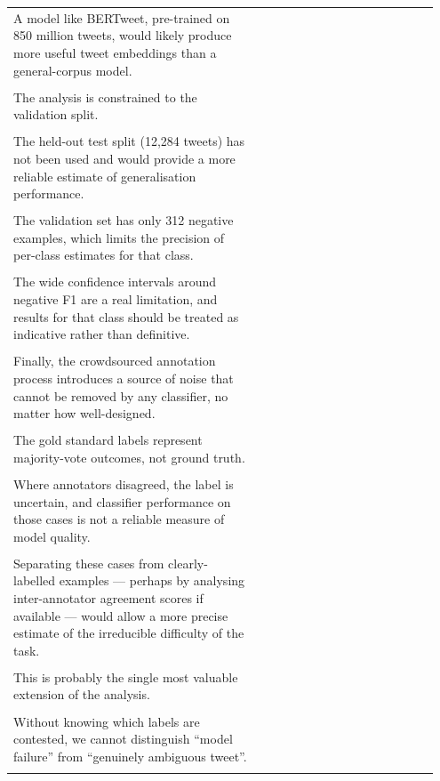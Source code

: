 \documentclass[11pt]{article}
\begin{document}
\begin{longtable}{|p{0.55\linewidth}|p{0.40\linewidth}|}
\hline
\rule{0pt}{3.5cm} & \\
\hline
A model like BERTweet, pre-trained on 850 million tweets, would likely produce more useful tweet embeddings than a general-corpus model. & \\[2pt]
\hline
\rule{0pt}{3.5cm} & \\
\hline
The analysis is constrained to the validation split. & \\[2pt]
\hline
\rule{0pt}{3.5cm} & \\
\hline
The held-out test split (12,284 tweets) has not been used and would provide a more reliable estimate of generalisation performance. & \\[2pt]
\hline
\rule{0pt}{3.5cm} & \\
\hline
The validation set has only 312 negative examples, which limits the precision of per-class estimates for that class. & \\[2pt]
\hline
\rule{0pt}{3.5cm} & \\
\hline
The wide confidence intervals around negative F1 are a real limitation, and results for that class should be treated as indicative rather than definitive. & \\[2pt]
\hline
\rule{0pt}{3.5cm} & \\
\hline
Finally, the crowdsourced annotation process introduces a source of noise that cannot be removed by any classifier, no matter how well-designed. & \\[2pt]
\hline
\rule{0pt}{3.5cm} & \\
\hline
The gold standard labels represent majority-vote outcomes, not ground truth. & \\[2pt]
\hline
\rule{0pt}{3.5cm} & \\
\hline
Where annotators disagreed, the label is uncertain, and classifier performance on those cases is not a reliable measure of model quality. & \\[2pt]
\hline
\rule{0pt}{3.5cm} & \\
\hline
Separating these cases from clearly-labelled examples --- perhaps by analysing inter-annotator agreement scores if available --- would allow a more precise estimate of the irreducible difficulty of the task. & \\[2pt]
\hline
\rule{0pt}{3.5cm} & \\
\hline
This is probably the single most valuable extension of the analysis. & \\[2pt]
\hline
\rule{0pt}{3.5cm} & \\
\hline
Without knowing which labels are contested, we cannot distinguish ``model failure'' from ``genuinely ambiguous tweet''. & \\[2pt]
\hline
\rule{0pt}{3.5cm} & \\
\hline
\end{longtable}
\end{document}
